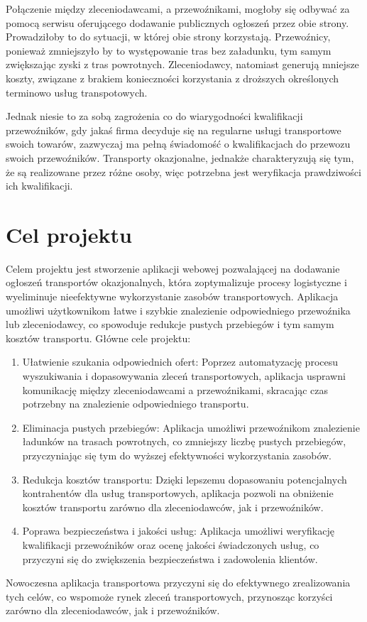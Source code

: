 Połączenie między zleceniodawcami, a przewoźnikami, mogłoby się odbywać za pomocą serwisu oferującego dodawanie publicznych ogłoszeń przez obie strony. Prowadziłoby to do sytuacji, w której obie strony korzystają. Przewoźnicy, ponieważ zmniejszyło by to występowanie tras bez załadunku, tym samym zwiększając zyski z tras powrotnych. Zleceniodawcy, natomiast generują mniejsze koszty, związane z brakiem konieczności korzystania z droższych określonych terminowo usług transpotowych. 

Jednak niesie to za sobą zagrożenia co do wiarygodności kwalifikacji przewoźników, gdy jakaś firma decyduje się na regularne usługi transportowe swoich towarów, zazwyczaj ma pełną świadomość o kwalifikacjach do przewozu swoich przewoźników. Transporty okazjonalne, jednakże charakteryzują się tym, że są realizowane przez różne osoby, więc potrzebna jest weryfikacja prawdziwości ich kwalifikacji.

\label{sec:cele}
\section{Cel projektu}
Celem projektu jest stworzenie aplikacji webowej pozwalającej na dodawanie ogłoszeń transportów okazjonalnych, która zoptymalizuje procesy logistyczne i wyeliminuje nieefektywne wykorzystanie zasobów transportowych. Aplikacja umożliwi użytkownikom łatwe i szybkie znalezienie odpowiedniego przewoźnika lub zleceniodawcy, co spowoduje redukcje pustych przebiegów i tym samym kosztów transportu.
Główne cele projektu:
\begin{enumerate}
    \item Ułatwienie szukania odpowiednich ofert: Poprzez automatyzację procesu wyszukiwania i dopasowywania zleceń transportowych, aplikacja usprawni komunikację między zleceniodawcami a przewoźnikami, skracając czas potrzebny na znalezienie odpowiedniego transportu.
    \item Eliminacja pustych przebiegów: Aplikacja umożliwi przewoźnikom znalezienie ładunków na trasach powrotnych, co zmniejszy liczbę pustych przebiegów, przyczyniając się tym do wyższej efektywności wykorzystania zasobów.
    \item Redukcja kosztów transportu: Dzięki lepszemu dopasowaniu potencjalnych kontrahentów dla usług transportowych, aplikacja pozwoli na obniżenie kosztów transportu zarówno dla zleceniodawców, jak i przewoźników.
    \item Poprawa bezpieczeństwa i jakości usług: Aplikacja umożliwi weryfikację kwalifikacji przewoźników oraz ocenę jakości świadczonych usług, co przyczyni się do zwiększenia bezpieczeństwa i zadowolenia klientów.
\end{enumerate}
Nowoczesna aplikacja transportowa przyczyni się do efektywnego zrealizowania tych celów, co wspomoże rynek zleceń transportowych, przynosząc korzyści zarówno dla zleceniodawców, jak i przewoźników.

